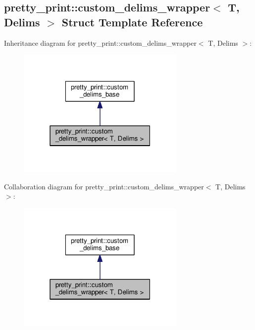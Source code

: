 \hypertarget{structpretty__print_1_1custom__delims__wrapper}{}\subsection{pretty\+\_\+print\+:\+:custom\+\_\+delims\+\_\+wrapper$<$ T, Delims $>$ Struct Template Reference}
\label{structpretty__print_1_1custom__delims__wrapper}


Inheritance diagram for pretty\+\_\+print\+:\+:custom\+\_\+delims\+\_\+wrapper$<$ T, Delims $>$\+:
\nopagebreak
\begin{figure}[H]
\begin{center}
\leavevmode
\includegraphics[width=231pt]{structpretty__print_1_1custom__delims__wrapper__inherit__graph}
\end{center}
\end{figure}


Collaboration diagram for pretty\+\_\+print\+:\+:custom\+\_\+delims\+\_\+wrapper$<$ T, Delims $>$\+:
\nopagebreak
\begin{figure}[H]
\begin{center}
\leavevmode
\includegraphics[width=231pt]{structpretty__print_1_1custom__delims__wrapper__coll__graph}
\end{center}
\end{figure}
